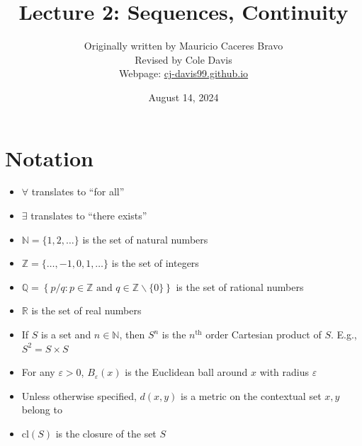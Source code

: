 \documentclass{article}
\title{Lecture 2: Sequences, Continuity}
\author{Originally written by Mauricio Caceres Bravo\\Revised by Cole Davis\\Webpage: \href{https://cj-davis99.github.io/math-camp.html}{cj-davis99.github.io}}
\date{August 14, 2024}
\newcommand{\cl}{\text{cl}}
\newcommand{\R}{\mathbb{R}}
\newcommand{\N}{\mathbb{N}}
\newcommand{\Q}{\mathbb{Q}}
\newcommand{\Z}{\mathbb{Z}}
\theoremstyle{definition}
\begin{document}
\maketitle
\tableofcontents
\newpage
\section*{Notation}
\begin{itemize}
    \item $\forall$ translates to ``for all''
    \item $\exists$ translates to ``there exists''
    \item $\N = \{1,2, \hdots\}$ is the set of natural numbers
    \item $\Z = \{\hdots, -1, 0, 1, \hdots \}$ is the set of integers
    \item $\Q = \left\{ p/q : p \in \Z \text{ and } q \in \Z\backslash\{0\} \right\}$ is the set of rational numbers
    \item $\R$ is the set of real numbers
    \item If $S$ is a set and $n\in \N$, then $S^n$ is the $n^{\text{th}}$ order Cartesian product of $S$. E.g., $S^2 = S \times S$ 
    \item For any $\varepsilon>0$, $B_\varepsilon(x)$ is the Euclidean ball around $x$ with radius $\varepsilon$
    \item Unless otherwise specified, $d(x, y)$ is a metric on the contextual set $x,y$ belong to
    \item $\cl(S)$ is the closure of the set $S$
\end{itemize}
\newpage
\end{document}
